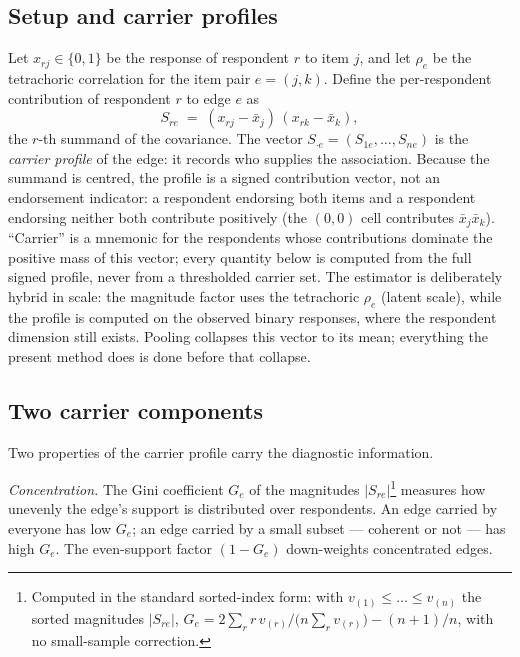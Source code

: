\documentclass[11pt]{article}
\begin{document}
\subsection{Setup and carrier profiles}
Let $x_{rj}\in\{0,1\}$ be the response of respondent $r$ to item $j$, and let
$\rho_e$ be the tetrachoric correlation for the item pair $e=(j,k)$. Define
the per-respondent contribution of respondent $r$ to edge $e$ as
\begin{equation}
S_{re} \;=\; (x_{rj}-\bar{x}_j)\,(x_{rk}-\bar{x}_k),
\end{equation}
the $r$-th summand of the covariance. The vector
$S_{\cdot e}=(S_{1e},\dots,S_{ne})$ is the \emph{carrier profile} of the
edge: it records who supplies the association. Because the summand is
centred, the profile is a signed contribution vector, not an endorsement
indicator: a respondent endorsing both items and a respondent endorsing
neither both contribute positively (the $(0,0)$ cell contributes
$\bar{x}_j\bar{x}_k$). ``Carrier'' is a mnemonic for the respondents whose
contributions dominate the positive mass of this vector; every quantity
below is computed from the full signed profile, never from a thresholded
carrier set. The estimator is deliberately hybrid in scale: the magnitude
factor uses the tetrachoric $\rho_e$ (latent scale), while the profile is
computed on the observed binary responses, where the respondent dimension
still exists. Pooling collapses this vector
to its mean; everything the present method does is done before that collapse.

\subsection{Two carrier components}
Two properties of the carrier profile carry the diagnostic information.

\emph{Concentration.} The Gini coefficient $G_e$ of the magnitudes
$|S_{re}|$\footnote{Computed in the standard sorted-index form: with
$v_{(1)}\le\dots\le v_{(n)}$ the sorted magnitudes $|S_{re}|$,
$G_e=2\sum_{r} r\,v_{(r)}\big/\big(n\sum_{r} v_{(r)}\big)-(n+1)/n$, with no
small-sample correction.} measures how unevenly the edge's support is
distributed over respondents. An edge carried by everyone has low $G_e$; an edge carried by a
small subset --- coherent or not --- has high $G_e$. The even-support factor
$(1-G_e)$ down-weights concentrated edges.
\end{document}
